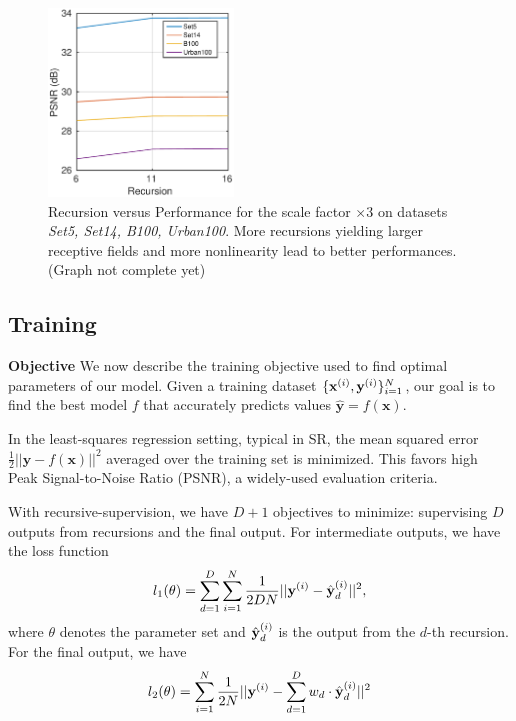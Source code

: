 \documentclass[10pt,twocolumn,letterpaper]{article}
\begin{document}
\begin{figure}
\begin{adjustwidth}{0cm}{-0.0cm}
\centering
{\graphicspath{{figs/graph1/}}\includegraphics[height=5.0cm]{graphOne.pdf}}
\caption{Recursion versus Performance for the scale factor $\times$3 on datasets \textit{Set5, Set14, B100, Urban100}.
More recursions yielding larger receptive fields and more nonlinearity lead to better performances. (Graph {\color{red}not complete} yet)}
\end{adjustwidth}
\end{figure}

\subsection{Training}

\textbf{Objective} We now describe the training objective used to find optimal parameters of our model. Given a training dataset $\{{\bf x}^{(i)},{\bf y}^{(i)}\}{}_{i=1}^{N}$, our goal is to find the best model $f$ that accurately predicts values $\mathbf{\hat{y}}=f(\mathbf{x})$.

In the least-squares regression setting, typical in SR, the mean squared error $\frac{1}{2}||\mathbf{y}-f(\mathbf{x})||^{2}$
averaged over the training set is minimized. This favors high Peak Signal-to-Noise
Ratio (PSNR), a widely-used evaluation criteria. 

With recursive-supervision, we have $D+1$ objectives to minimize: supervising $D$ outputs from recursions and the final output. For intermediate outputs, we have the loss function 
\begin{equation}
l_1(\theta) = \sum_{d=1}^D \sum_{i=1}^N \frac{1}{2DN}||{\bf y}^{(i)} -  \hat{\bf y}_d^{(i)} ||^{2},
\end{equation}
where $\theta$ denotes the parameter set and $\hat{\bf y}_d^{(i)}$ is the output from the $d$-th recursion. For the final output, we have 
\begin{equation}
l_2(\theta) = \sum_{i=1}^N \frac{1}{2N}||{\bf y}^{(i)} -  \sum_{d=1}^D  w_d \cdot \hat{\bf y}_d^{(i)} ||^{2}
\end{equation}
\end{document}
